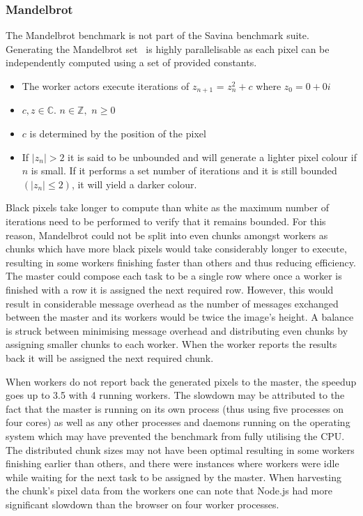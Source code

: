 \documentclass[oneside]{um-fict}
\begin{document}
\subsubsection{Mandelbrot}
The Mandelbrot benchmark is not part of the Savina benchmark suite. Generating the Mandelbrot set~\cite{mandelbrot} is highly parallelisable as each pixel can be independently computed using a set of provided constants. 
\begin{itemize}
    \item The worker actors execute iterations of $z_{n+1}$ = $z_{n}^{2}+c$ where $z_0 = 0 + 0i$
    \item $c, z \in \mathbb{C}$. $n \in \mathbb{Z},$ $n \ge 0$
    \item $c$ is determined by the position of the pixel
    \item If $|z_n|> 2$ it is said to be unbounded and will generate a lighter pixel colour if $n$ is small. If it performs a set number of iterations and it is still bounded $(|z_n| \le 2)$, it will yield a darker colour.
\end{itemize}
Black pixels take longer to compute than white as the maximum number of iterations need to be performed to verify that it remains bounded. For this reason, Mandelbrot could not be split into even chunks amongst workers as chunks which have more black pixels would take considerably longer to execute, resulting in some workers finishing faster than others and thus reducing efficiency. The master could compose each task to be a single row where once a worker is finished with a row it is assigned the next required row. However, this would result in considerable message overhead as the number of messages exchanged between the master and its workers would be twice the image's height. A balance is struck between minimising message overhead and distributing even chunks by assigning smaller chunks to each worker. When the worker reports the results back it will be assigned the next required chunk.

When workers do not report back the generated pixels to the master, the speedup goes up to 3.5 with 4 running workers. The slowdown may be attributed to the fact that the master is running on its own process (thus using five processes on four cores) as well as any other processes and daemons running on the operating system which may have prevented the benchmark from fully utilising the CPU. The distributed chunk sizes may not have been optimal resulting in some workers finishing earlier than others, and there were instances where workers were idle while waiting for the next task to be assigned by the master. When harvesting the chunk's pixel data from the workers one can note that Node.js had more significant slowdown than the browser on four worker processes.
\end{document}
